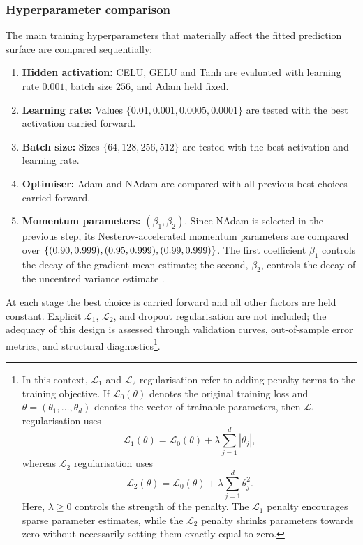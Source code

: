 \subsubsection{Hyperparameter comparison}

The main training hyperparameters that materially affect the fitted
prediction surface are compared sequentially:

\begin{enumerate}
    \item \textbf{Hidden activation:}  CELU, GELU and Tanh are evaluated
          with learning rate $0.001$, batch size $256$, and Adam held fixed.
    \item \textbf{Learning rate:}  Values $\{0.01, 0.001, 0.0005, 0.0001\}$
          are tested with the best activation carried forward.
    \item \textbf{Batch size:}  Sizes $\{64, 128, 256, 512\}$ are tested
          with the best activation and learning rate.
    \item \textbf{Optimiser:}  Adam and NAdam are compared with all previous
          best choices carried forward.
    \item \textbf{Momentum parameters:} $(\beta_1,\beta_2)$.  Since NAdam is
          selected in the previous step, its Nesterov-accelerated momentum
          parameters are compared over
          $\{(0.90,0.999),\linebreak[1] (0.95,0.999),\linebreak[1] (0.99,0.999)\}$.  The first
          coefficient $\beta_1$ controls the decay of the gradient mean
          estimate; the second, $\beta_2$, controls the decay of the
          uncentred variance estimate \citep{dozat2016incorporating}.
\end{enumerate}

At each stage the best choice is carried forward and all other factors are
held constant.  Explicit $\mathcal{L}_1$, $\mathcal{L}_2$, and dropout
\citep{srivastava2014dropout} regularisation are not
included; the adequacy of this design is assessed through validation
curves, out-of-sample error metrics, and structural diagnostics\footnote{In this context, $\mathcal{L}_1$ and $\mathcal{L}_2$
regularisation refer to adding penalty terms to the training objective. If
\(\mathcal{L}_{0}(\theta)\) denotes the original training loss and
\(\theta=(\theta_1,\ldots,\theta_d)\) denotes the vector of trainable
parameters, then $\mathcal{L}_1$ regularisation uses
\[
    \mathcal{L}_{1}(\theta)
    =
    \mathcal{L}_{0}(\theta)
    +
    \lambda
    \sum_{j=1}^{d}
    |\theta_j|,
\]
whereas $\mathcal{L}_2$ regularisation uses
\[
    \mathcal{L}_{2}(\theta)
    =
    \mathcal{L}_{0}(\theta)
    +
    \lambda
    \sum_{j=1}^{d}
    \theta_j^2.
\]
Here, \(\lambda \geq 0\) controls the strength of the penalty. The $\mathcal{L}_1$
penalty encourages sparse parameter estimates, while the $\mathcal{L}_2$ penalty
shrinks parameters towards zero without necessarily setting them exactly equal
to zero.}.

